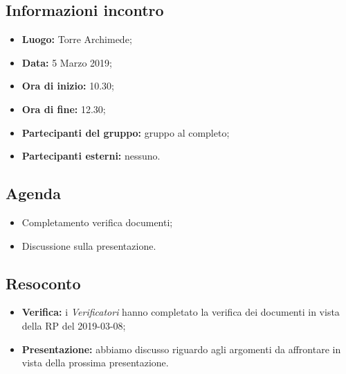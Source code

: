 \subsection{Informazioni incontro}
\begin{itemize}
	\item { \textbf{Luogo:} Torre Archimede};
	\item { \textbf{Data:} 5 Marzo 2019};
	\item { \textbf{Ora di inizio:} 10.30};
	\item { \textbf{Ora di fine:} 12.30};
	\item { \textbf{Partecipanti del gruppo:} gruppo al completo};
	\item { \textbf{Partecipanti esterni:} nessuno}.
\end{itemize}


\subsection{Agenda}
\begin{itemize}
	\item {Completamento verifica documenti;}
	\item {Discussione sulla presentazione.}
\end{itemize}

\subsection{Resoconto}
\begin{itemize}
	\item { \textbf{Verifica:} i \emph{Verificatori} hanno completato la verifica dei documenti in vista della RP del 2019-03-08;}
	\item { \textbf{Presentazione:} abbiamo discusso riguardo agli argomenti da affrontare in vista della prossima presentazione.}
\end{itemize}

